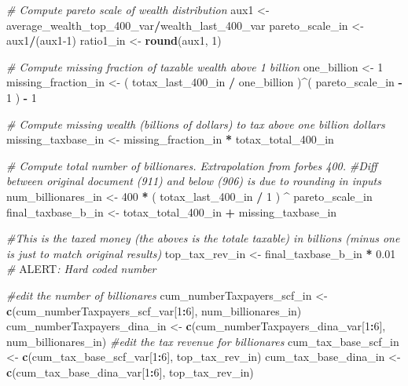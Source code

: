 \documentclass[]{article}
\newenvironment{Shaded}{\begin{snugshade}}{\end{snugshade}}
\newcommand{\AlertTok}[1]{\textcolor[rgb]{0.94,0.16,0.16}{#1}}
\newcommand{\CommentTok}[1]{\textcolor[rgb]{0.56,0.35,0.01}{\textit{#1}}}
\newcommand{\DecValTok}[1]{\textcolor[rgb]{0.00,0.00,0.81}{#1}}
\newcommand{\FloatTok}[1]{\textcolor[rgb]{0.00,0.00,0.81}{#1}}
\newcommand{\KeywordTok}[1]{\textcolor[rgb]{0.13,0.29,0.53}{\textbf{#1}}}
\newcommand{\NormalTok}[1]{#1}
\newcommand{\OperatorTok}[1]{\textcolor[rgb]{0.81,0.36,0.00}{\textbf{#1}}}
\newcommand{\StringTok}[1]{\textcolor[rgb]{0.31,0.60,0.02}{#1}}
\begin{document}
\begin{Shaded}
\begin{Highlighting}[]
    \CommentTok{# Compute pareto scale of wealth distribution}
\NormalTok{    aux1 <-}\StringTok{ }\NormalTok{average_wealth_top_}\DecValTok{400}\NormalTok{_var}\OperatorTok{/}\NormalTok{wealth_last_}\DecValTok{400}\NormalTok{_var}
\NormalTok{    pareto_scale_in <-}\StringTok{ }\NormalTok{aux1}\OperatorTok{/}\NormalTok{(aux1}\DecValTok{-1}\NormalTok{) }
\NormalTok{    ratio1_in <-}\StringTok{ }\KeywordTok{round}\NormalTok{(aux1, }\DecValTok{1}\NormalTok{)}
    
    \CommentTok{# Compute missing fraction of taxable wealth above 1 billion}
\NormalTok{    one_billion <-}\StringTok{ }\DecValTok{1} 
\NormalTok{    missing_fraction_in <-}\StringTok{ }\NormalTok{( totax_last_}\DecValTok{400}\NormalTok{_in }\OperatorTok{/}\StringTok{ }\NormalTok{one_billion )}\OperatorTok{^}\NormalTok{( pareto_scale_in }\OperatorTok{-}\StringTok{ }\DecValTok{1}\NormalTok{ ) }\OperatorTok{-}\StringTok{ }\DecValTok{1}

    \CommentTok{# Compute missing wealth (billions of dollars) to tax above one billion dollars}
\NormalTok{    missing_taxbase_in <-}\StringTok{ }\NormalTok{missing_fraction_in }\OperatorTok{*}\StringTok{ }\NormalTok{totax_total_}\DecValTok{400}\NormalTok{_in}

    \CommentTok{# Compute total number of billionares. Extrapolation from forbes 400. }
    \CommentTok{#Diff between original document (911) and below (906) is due to rounding in inputs }
\NormalTok{    num_billionares_in <-}\StringTok{ }\DecValTok{400} \OperatorTok{*}\StringTok{ }\NormalTok{( totax_last_}\DecValTok{400}\NormalTok{_in }\OperatorTok{/}\StringTok{ }\DecValTok{1}\NormalTok{ ) }\OperatorTok{^}\StringTok{ }\NormalTok{pareto_scale_in }
\NormalTok{    final_taxbase_b_in <-}\StringTok{ }\NormalTok{totax_total_}\DecValTok{400}\NormalTok{_in }\OperatorTok{+}\StringTok{ }\NormalTok{missing_taxbase_in}

    \CommentTok{#This is the taxed money (the aboves is the totale taxable) in billions  (minus one is just to match original results)}
\NormalTok{    top_tax_rev_in <-}\StringTok{ }\NormalTok{final_taxbase_b_in }\OperatorTok{*}\StringTok{ }\FloatTok{0.01}                                     \CommentTok{# }\AlertTok{ALERT}\CommentTok{: Hard coded number}
     
    \CommentTok{#edit the number of billionares}
\NormalTok{    cum_numberTaxpayers_scf_in <-}\StringTok{ }\KeywordTok{c}\NormalTok{(cum_numberTaxpayers_scf_var[}\DecValTok{1}\OperatorTok{:}\DecValTok{6}\NormalTok{], num_billionares_in)}
\NormalTok{    cum_numberTaxpayers_dina_in <-}\StringTok{ }\KeywordTok{c}\NormalTok{(cum_numberTaxpayers_dina_var[}\DecValTok{1}\OperatorTok{:}\DecValTok{6}\NormalTok{], num_billionares_in)}
    \CommentTok{#edit the tax revenue for billionares    }
\NormalTok{    cum_tax_base_scf_in <-}\StringTok{ }\KeywordTok{c}\NormalTok{(cum_tax_base_scf_var[}\DecValTok{1}\OperatorTok{:}\DecValTok{6}\NormalTok{], top_tax_rev_in)}
\NormalTok{    cum_tax_base_dina_in <-}\StringTok{ }\KeywordTok{c}\NormalTok{(cum_tax_base_dina_var[}\DecValTok{1}\OperatorTok{:}\DecValTok{6}\NormalTok{], top_tax_rev_in)}
    

\end{Highlighting}
\end{Shaded}
\end{document}
